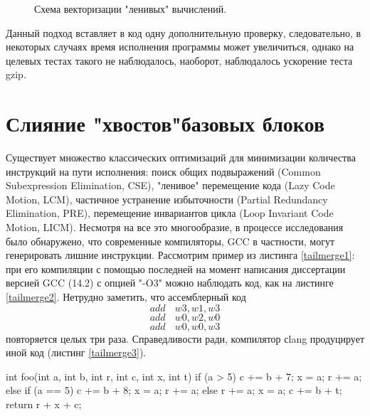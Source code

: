  \begin{figure}[htbp]
 	\centering
 	
 	\caption{Схема векторизации "ленивых"\phantom{ } вычислений.}
 	\label{lcv2}
 \end{figure}
 
 Данный подход вставляет в код одну дополнительную проверку, следовательно, в некоторых случаях время исполнения программы может увеличиться, однако на целевых тестах такого не наблюдалось, наоборот, наблюдалось ускорение теста gzip.
\section{Слияние "хвостов"\phantom{ }базовых блоков} 

Существует множество классических оптимизаций для минимизации количества инструкций на пути исполнения: поиск общих подвыражений (Common Subexpression Elimination, CSE), "ленивое"\phantom{} перемещение кода (Lazy Code Motion, LCM), частичное устранение избыточности (Partial Redundancy Elimination, PRE), перемещение инвариантов цикла (Loop Invariant Code Motion, LICM). Несмотря на все это многообразие, в процессе исследования было обнаружено, что современные компиляторы, GCC в частности, могут генерировать лишние инструкции. Рассмотрим пример из листинга \ref{tailmerge1}: при его компиляции с помощью последней на момент написания диссертации версией GCC (14.2) с опцией "-O3"\phantom{} можно наблюдать код, как на листинге \ref{tailmerge2}. Нетрудно заметить, что ассемблерный код 
$$add\phantom{ss}w3, w1, w3$$
$$add\phantom{ss}w0, w2, w0$$
$$add\phantom{ss}w0, w0, w3$$
повторяется целых три раза. Справедливости ради, компилятор сlang продуцирует иной код (листинг \ref{tailmerge3}).

 \begin{ListingEnv}[!h]
	\captiondelim{ } %
	\caption{Пример исходного кода для оптимизации слияния "хвостов"\phantom{ }базовых блоков.}\label{tailmerge1}
	
	\begin{Verb}
         int foo(int a, int b, int r, int c, int x, int t)
         {
         	if (a > 5) {
         		c += b + 7;
         		x = a;
         		r += a;
         	} else if (a == 5) {
         		c += b + 8;
         		x = a;
         		r += a;
         	} else {
         		r += a;
         		x = a;
         		c += b + t;
         	}
         	return r + x + c;
         }
	\end{Verb}
\end{ListingEnv}



